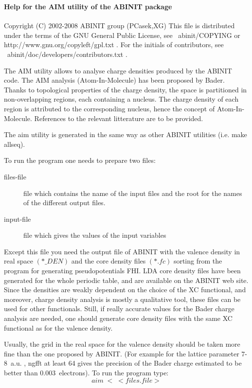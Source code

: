 \documentclass[11pt]{article}
\begin{document}
 
{\Huge \bf Help for the AIM utility of the ABINIT package} \\ \\

     Copyright (C) 2002-2008 ABINIT group (PCasek,XG)
     This file is distributed under the terms of the
     GNU General Public License, see ~abinit/COPYING
     or http://www.gnu.org/copyleft/gpl.txt .
     For the initials of contributors, see ~abinit/doc/developers/contributors.txt .

The AIM utility allows to analyse charge densities
produced by the ABINIT code. The AIM analysis (Atom-In-Molecule)
has been proposed by Bader. Thanks to topological
properties of the charge density, the space is partitioned
in non-overlapping regions, each containing a nucleus.
The charge density of each region is attributed to the
corresponding nucleus, hence the concept of Atom-In-Molecule.
References to the relevant litterature are to be provided.

The aim utility is generated in the same way as other
ABINIT utilities (i.e. make allseq).

To run the program one needs to prepare two files:
\begin{description}
\item [files-file] file which contains the name of the input files and the 
root for the names of the different output files.
\item [input-file] file which gives the values of the input variables    
\end{description}
Except this file you need the output file of ABINIT with the valence
density in real space $(*\_DEN)$ and the core density files $(*.fc)$ sorting 
from the program for generating pseudopotentials FHI.
LDA core density files have been generated for the
whole periodic table, and are available on the ABINIT web site.
Since the densities are weakly dependent on the choice of the
XC functional, and moreover, charge density analysis
is mostly a qualitative tool, these files can be used
for other functionals. Still, if really accurate 
values for the Bader charge analysis are needed, one should
generate core density files with the same XC functional as
for the valence density.

Usually, the grid in the real space for the valence density should be 
taken more fine than the one proposed by ABINIT. 
(For example for the lattice parameter 7-8~a.u. , ngfft at least 64
gives the precision of the Bader charge estimated to be better 
than 0.003~electrons).
To run the program type: $$aim\; < \; <files.file> $$
\end{document}
